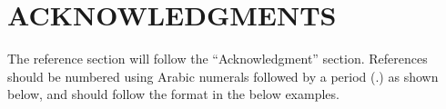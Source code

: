 \documentclass{aip-cp}
\begin{document}

\section{ACKNOWLEDGMENTS}
The reference section will follow the ``Acknowledgment'' section.  References should be numbered using Arabic numerals followed by a period (.) as shown below, and should follow the format in the below examples.


\nocite{*}
%
%
\end{document}
